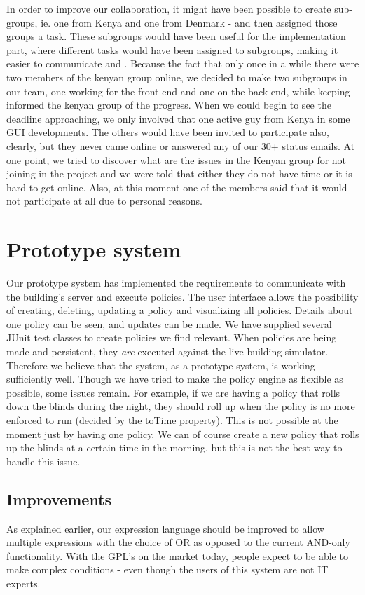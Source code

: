 In order to improve our collaboration, it might have been possible to create sub-groups, ie. one from Kenya and one from Denmark - and then assigned those groups a task. These subgroups would have been useful for the implementation part, where different tasks would have been assigned to subgroups, making it easier to communicate and . Because the fact that only once in a while there were two members of the kenyan group online, we decided to make two subgroups in our team, one working for the front-end and one on the back-end, while keeping informed the kenyan group of the progress.  When we could begin to see the deadline approaching, we only involved that one active guy from Kenya in some GUI developments. The others would have been invited to participate also, clearly, but they never came online or answered any of our 30+ status emails. At one point, we tried to discover what are the issues in the Kenyan group for not joining in the project and we were told that either they do not have time or it is hard to get online. Also, at this moment one of the members said that it would not participate at all due to personal reasons. 

\section{Prototype system}\label{sec:product}
Our prototype system has implemented the requirements to communicate with the building's server and execute policies. The user interface allows the possibility of creating, deleting, updating a policy and visualizing all policies. Details about one policy can be seen, and updates can be made. 
We have supplied several JUnit test classes to create policies we find relevant. When policies are being made and persistent, they \textit{are} executed against the live building simulator. Therefore we believe that the system, as a prototype system, is working sufficiently well.
Though we have tried to make the policy engine as flexible as possible, some issues remain. For example, if we are having a policy that rolls down the blinds during the night, they should roll up when the policy is no more enforced to run (decided by the toTime property). This is not possible at the moment just by having one policy. We can of course create a new policy that rolls up the blinds at a certain time in the morning, but this is not the best way to handle this issue.

\subsection{Improvements}\label{subsec:improvements}
As explained earlier, our expression language should be improved to allow multiple expressions with the choice of OR as opposed to the current AND-only functionality. With the GPL's on the market today, people expect to be able to make complex conditions - even though the users of this system are not IT experts. 

